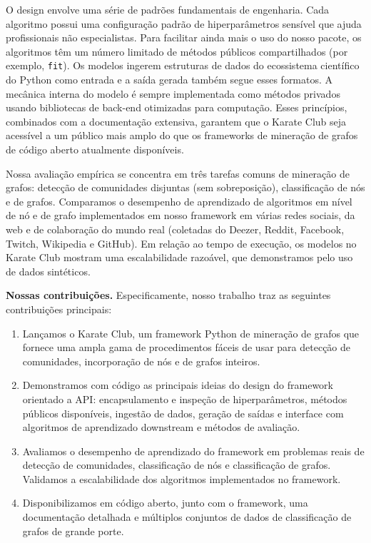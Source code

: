 \documentclass[sigconf]{acmart}
\begin{document}
O design envolve uma série de padrões fundamentais de engenharia. Cada algoritmo possui uma configuração padrão de hiperparâmetros sensível que ajuda profissionais não especialistas. Para facilitar ainda mais o uso do nosso pacote, os algoritmos têm um número limitado de métodos públicos compartilhados (por exemplo, \texttt{fit}). Os modelos ingerem estruturas de dados do ecossistema científico do Python \cite{NetworkX, SciPy, NumPy} como entrada e a saída gerada também segue esses formatos. A mecânica interna do modelo é sempre implementada como métodos privados usando bibliotecas de back-end otimizadas \cite{PyGSP, GenSim, SciPy, NumPy} para computação. Esses princípios, combinados com a documentação extensiva, garantem que o Karate Club seja acessível a um público mais amplo do que os frameworks de mineração de grafos de código aberto atualmente disponíveis.

Nossa avaliação empírica se concentra em três tarefas comuns de mineração de grafos: detecção de comunidades disjuntas (sem sobreposição), classificação de nós e de grafos. Comparamos o desempenho de aprendizado de algoritmos em nível de nó e de grafo implementados em nosso framework em várias redes sociais, da web e de colaboração do mundo real (coletadas do Deezer, Reddit, Facebook, Twitch, Wikipedia e GitHub). Em relação ao tempo de execução, os modelos no Karate Club mostram uma escalabilidade razoável, que demonstramos pelo uso de dados sintéticos.

\textbf{Nossas contribuições.} Especificamente, nosso trabalho traz as seguintes contribuições principais:
\begin{enumerate}
    \item Lançamos o Karate Club, um framework Python de mineração de grafos que fornece uma ampla gama de procedimentos fáceis de usar para detecção de comunidades, incorporação de nós e de grafos inteiros.
    \item Demonstramos com código as principais ideias do design do framework orientado a API: encapsulamento e inspeção de hiperparâmetros, métodos públicos disponíveis, ingestão de dados, geração de saídas e interface com algoritmos de aprendizado downstream e métodos de avaliação.
    \item Avaliamos o desempenho de aprendizado do framework em problemas reais de detecção de comunidades, classificação de nós e classificação de grafos. Validamos a escalabilidade dos algoritmos implementados no framework.
    \item Disponibilizamos em código aberto, junto com o framework, uma documentação detalhada e múltiplos conjuntos de dados de classificação de grafos de grande porte.
\end{enumerate}
\end{document}
